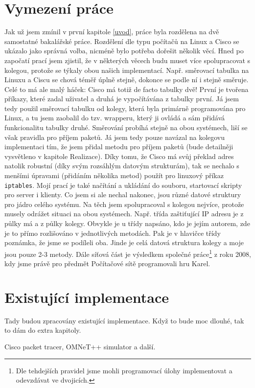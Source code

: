 \section{Vymezení práce} \label{vymezeni}
Jak už jsem zmínil v první kapitole \ref{uvod}, práce byla rozdělena na dvě samostatné bakalářské práce. Rozdělení dle typu počítačů na Linux a Cisco se ukázalo jako správná volba, nicméně bylo potřeba dořešit několik věcí. Hned po započatí prací jsem zjistil, že v některých věcech budu muset více spolupracovat s kolegou, protože se týkaly obou našich implementací. Např. směrovací tabulka na Linuxu a Ciscu se chová téměř úplně stejně, dokonce se podle ní i stejně směruje. Celé to má ale malý háček: Cisco má totiž de facto tabulky dvě! První je tvořena příkazy, které zadal uživatel a druhá je vypočítávána z tabulky první. Já jsem tedy použil směrovací tabulku od kolegy, která byla primárně programována pro Linux, a tu jsem zaobalil do tzv. wrapperu, který ji ovládá a sám přidává funkcionalitu tabulky druhé. Směrování probíhá stejně na obou systémech, liší se však pravidla pro příjem paketů. Já jsem tedy pouze navázal na kolegovu implementaci tím, že jsem přidal metodu pro příjem paketů (bude detailněji vysvětleno v kapitole Realizace).  Díky tomu, že Cisco má svůj překlad adres natolik robustní (díky svým rozsáhlým datovým strukturám), tak se nechalo s menšími úpravami (přidáním několika metod) použít pro linuxový příkaz \verb|iptables|. Mojí prací je také načítání a ukládání do souboru, startovací skripty pro server i klienty. Co jsem si ale nechal nakonec, jsou různé datové struktury pro jádro celého systému. Na těch jsem spolupracoval s kolegou nejvíce, protože musely odrážet situaci na obou systémech. Např. třída zaštiťující IP adresu je z půlky má a z půlky kolegy. Obvykle je u třídy napsáno, kdo je jejím autorem, zde je to přímo rozlišováno v jednotlivých metodách. Pak je v hlavičce třídy poznámka, že jsme se podíleli oba. Jinde je celá datová struktura kolegy a moje jsou pouze 2-3 metody. Dále síťová část je výsledkem společné práce\footnote{Dle tehdejších pravidel jsme mohli programovací úlohy implementovat a odevzdávat ve dvojicích.} z roku 2008, kdy jsme právě pro předmět Počítačové sítě programovali hru Karel.


\section{Existující implementace}
Tady budou zpracovány existující implementace. Když to bude moc dlouhé, tak to dám do extra kapitoly.

Cisco packet tracer, OMNeT++ simulator a další.